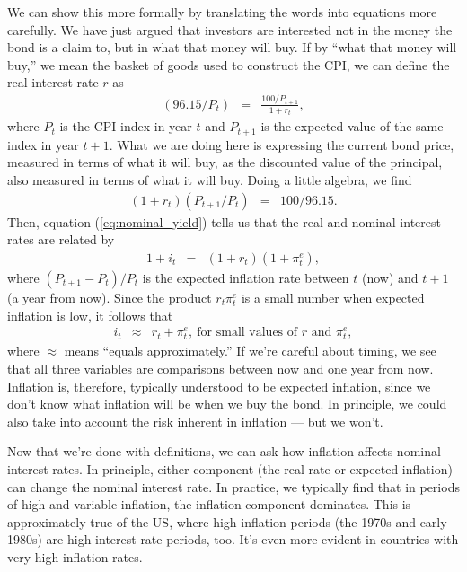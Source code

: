 We can show this more formally
by translating the words into equations more carefully.
We have just argued that investors are interested not in the money the
bond  is a claim to, but in what that money will buy. If by ``what
that money will buy,'' we mean the basket of goods used to construct
the CPI, we can define the real interest rate $r$ as
%
\begin{eqnarray*}
    (96.15/P_t) &=& \frac{100/ P_{t+1}}{1+r_t},
\end{eqnarray*}
%
where $P_{t}$ is the CPI index in year $t$ and $P_{t+1}$ is the
expected value of the same index in year $t+1$. What we are doing
here is expressing the current bond  price, measured in terms of what
it will buy, as the discounted value of the principal, also measured
in terms of what it will buy. Doing a little algebra, we find
%
\begin{eqnarray*}
    (1+r_t)(P_{t+1}/P_{t}) &=& 100/96.15.
\end{eqnarray*}
%
Then, equation (\ref{eq:nominal_yield}) tells us that the real and
nominal interest rates are related by
\begin{eqnarray*}
    1 + i_t   &=& (1+r_t)(1+\pi_{t}^e),
\end{eqnarray*}
where $(P_{t+1}-P_t)/P_t $ is the expected inflation rate between
$t$ (now) and $t+1$ (a year from now). Since the product
$r_{t}\pi_{t}^e$ is a small number when expected inflation is low, it follows that
\begin{eqnarray*}
    i_t  &\approx&  r_t + \pi_{t}^e, \ \mbox{for \ small \ values \ of \ $r$ and $\pi_{t}^e$},
\end{eqnarray*}
where $\approx$ means ``equals approximately.''
If we're careful about timing, we see that all three variables
are comparisons between now and one year from now.
Inflation is, therefore, typically understood to be
expected inflation, since we don't know what inflation
will be when we buy the bond.
In principle, we could also take into account the risk
inherent in inflation --- but we won't.


Now that we're done with definitions, we can ask how inflation
affects nominal interest rates.
In principle, either component (the real rate or expected inflation)
can change the nominal interest rate.
In practice, we typically find that in periods of
high and variable inflation,
the inflation component dominates.
This is approximately true of the US, where high-inflation periods
(the 1970s and early 1980s)
are high-interest-rate periods, too.
It's even more evident in countries with very high inflation rates.


